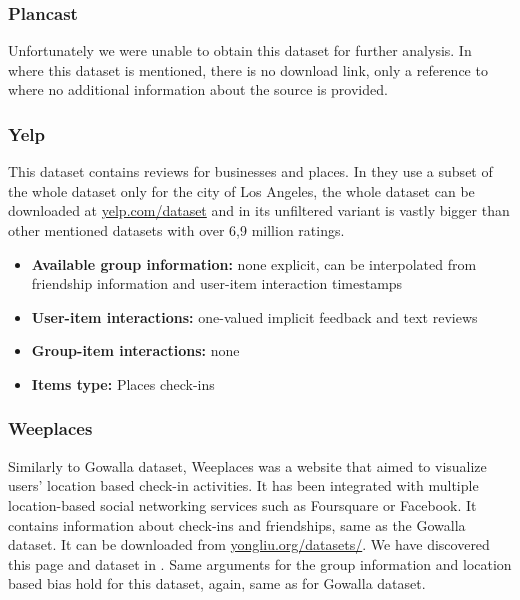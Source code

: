 \subsubsection{Plancast} \label{subsubsec:04_group_datasets.overview.plancast}
Unfortunately we were unable to obtain this dataset for further analysis. In \cite{meetup_plancast} where this dataset is mentioned, there is no download link, only a reference to \cite{plancast_origin} where no additional information about the source is provided.

\subsubsection{Yelp}\label{subsubsec:04_group_datasets.overview.yelp}
This dataset contains reviews for businesses and places. In \cite{gowalla_weeplaces_yelp} they use a subset of the whole dataset only for the city of Los Angeles, the whole dataset can be downloaded at \href{https://www.yelp.com/dataset}{yelp.com/dataset} and in its unfiltered variant is vastly bigger than other mentioned datasets with over 6,9 million ratings.

\begin{itemize}
    \item \textbf{Available group information:} none explicit, can be interpolated from friendship information and user-item interaction timestamps
    \item \textbf{User-item interactions:} one-valued implicit feedback and text reviews
    \item \textbf{Group-item interactions:} none
    \item \textbf{Items type:} Places check-ins
\end{itemize}


\subsubsection{Weeplaces} \label{subsubsec:04_group_datasets.overview.weeplaces}
Similarly to Gowalla dataset, Weeplaces was a website that aimed to visualize users' location based check-in activities. It has been integrated with multiple location-based social networking services such as Foursquare or Facebook.
It contains information about check-ins and friendships, same as the Gowalla dataset. It can be downloaded from \href{https://www.yongliu.org/datasets/}{yongliu.org/datasets/}. We have discovered this page and dataset in \cite{gowalla_weeplaces_yelp}.
Same arguments for the group information and location based bias hold for this dataset, again, same as for Gowalla dataset. 

